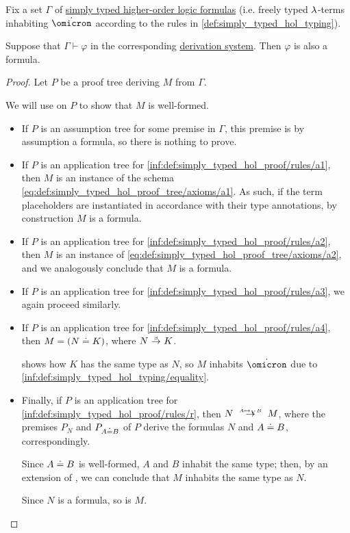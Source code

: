 \begin{proposition}\label{thm:simply_typed_hol_proof_produce_formulas}
  Fix a set \( \Gamma \) of \hyperref[def:simply_typed_hol_formula]{simply typed higher-order logic formulas} (i.e. freely typed \( {\mathrm \lambda} \)-terms inhabiting \( \syn\omicron \) according to the rules in \cref{def:simply_typed_hol_typing}).

  Suppose that \( \Gamma \vdash \varphi \) in the corresponding \hyperref[def:simply_typed_hol_proof_tree]{derivation system}. Then \( \varphi \) is also a formula.
\end{proposition}
\begin{proof}
  Let \( P \) be a proof tree deriving \( M \) from \( \Gamma \).

  We will use  on \( P \) to show that \( M \) is well-formed.
  \begin{itemize}
    \item If \( P \) is an assumption tree for some premise in \( \Gamma \), this premise is by assumption a formula, so there is nothing to prove.

    \item If \( P \) is an application tree for \ref{inf:def:simply_typed_hol_proof/rules/a1}, then \( M \) is an instance of the schema \eqref{eq:def:simply_typed_hol_proof_tree/axioms/a1}. As such, if the term placeholders are instantiated in accordance with their type annotations, by construction \( M \) is a formula.

    \item If \( P \) is an application tree for \ref{inf:def:simply_typed_hol_proof/rules/a2}, then \( M \) is an instance of \eqref{eq:def:simply_typed_hol_proof_tree/axioms/a2}, and we analogously conclude that \( M \) is a formula.

    \item If \( P \) is an application tree for \ref{inf:def:simply_typed_hol_proof/rules/a3}, we again proceed similarly.

    \item If \( P \) is an application tree for \ref{inf:def:simply_typed_hol_proof/rules/a4}, then \( M = (N \doteq K) \), where \( N \bred K \).

     shows how \( K \) has the same type as \( N \), so \( M \) inhabits \( \syn\omicron \) due to \ref{inf:def:simply_typed_hol_typing/equality}.

    \item Finally, if \( P \) is an application tree for \ref{inf:def:simply_typed_hol_proof/rules/r}, then \( N \redrel{A \mapsto_V B} M \), where the premises \( P_N \) and \( P_{A \doteq B} \) of \( P \) derive the formulas \( N \) and \( A \doteq B \), correspondingly.

    Since \( A \doteq B \) is well-formed, \( A \) and \( B \) inhabit the same type; then, by an extension of , we can conclude that \( M \) inhabits the same type as \( N \).

    Since \( N \) is a formula, so is \( M \).
  \end{itemize}
\end{proof}

